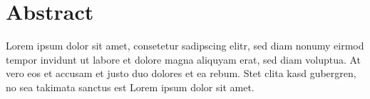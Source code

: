 \chapter*{Abstract}

Lorem ipsum dolor sit amet, consetetur sadipscing elitr, sed diam nonumy eirmod tempor invidunt ut 
labore et dolore magna aliquyam erat, sed diam voluptua. At vero eos et accusam et justo duo dolores 
et ea rebum. Stet clita kasd gubergren, no sea takimata sanctus est Lorem ipsum dolor sit amet.